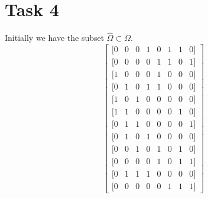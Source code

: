 \documentclass{article}
\begin{document}
    \section*{Task 4}
    Initially we have the subset $\hat{\Omega} \subset \Omega$.
    \[
        \begin{bmatrix}
            [0 & 0 & 0 & 1 & 0 & 1 & 1 & 0]\\
            [0 & 0 & 0 & 0 & 1 & 1 & 0 & 1]\\
            [1 & 0 & 0 & 0 & 1 & 0 & 0 & 0]\\
            [0 & 1 & 0 & 1 & 1 & 0 & 0 & 0]\\
            [1 & 0 & 1 & 0 & 0 & 0 & 0 & 0]\\
            [1 & 1 & 0 & 0 & 0 & 0 & 1 & 0]\\
            [0 & 1 & 1 & 0 & 0 & 0 & 0 & 1]\\
            [0 & 1 & 0 & 1 & 0 & 0 & 0 & 0]\\
            [0 & 0 & 1 & 0 & 1 & 0 & 1 & 0]\\
            [0 & 0 & 0 & 0 & 1 & 0 & 1 & 1]\\
            [0 & 1 & 1 & 1 & 0 & 0 & 0 & 0]\\
            [0 & 0 & 0 & 0 & 0 & 1 & 1 & 1]
        \end{bmatrix}
    \]
\end{document}
